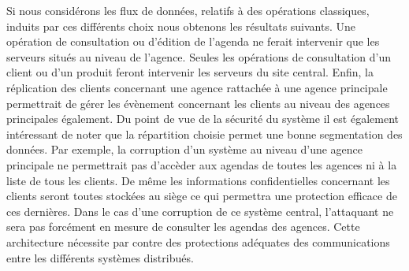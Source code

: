Si nous considérons les flux de données, relatifs à des opérations classiques, induits par ces différents choix nous obtenons les résultats suivants. Une opération de consultation ou d'édition de l'agenda ne ferait intervenir que les serveurs situés au niveau de l'agence. Seules les opérations de consultation d'un client ou d'un produit feront intervenir les serveurs du site central. Enfin, la réplication des clients concernant une agence rattachée à une agence principale permettrait de gérer les évènement concernant les clients au niveau des agences principales également.
Du point de vue de la sécurité du système il est également intéressant de noter que la répartition choisie permet une bonne segmentation des données. Par exemple, la corruption d'un système au niveau d'une agence principale ne permettrait pas d'accèder aux agendas de toutes les agences ni à la liste de tous les clients. De même les informations confidentielles concernant les clients seront toutes stockées au siège ce qui permettra une protection efficace de ces dernières. Dans le cas d'une corruption de ce système central, l'attaquant ne sera pas forcément en mesure de consulter les agendas des agences. Cette architecture nécessite par contre des protections adéquates des communications entre les différents systèmes distribués.
